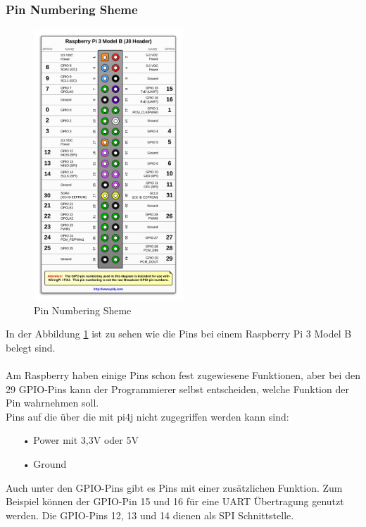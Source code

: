 \newpage

\subsubsection{Pin Numbering Sheme}

\begin{figure}
\vspace{-35pt}
  \begin{center}
    \includegraphics[width=0.50\textwidth]{Bilder/pi4j/PinNumberingSheme}
  \end{center}
  \caption[Pin Numbering Sheme]{Pin Numbering Sheme\protect\footnotemark}
  \label{Pin Numbering Sheme}
  \vspace{-120pt}
\end{figure}


In der Abbildung \ref{Pin Numbering Sheme} ist zu sehen wie die Pins bei einem Raspberry Pi 3 Model B belegt sind.
\\ \\
Am Raspberry haben einige Pins schon fest zugewiesene Funktionen, aber bei den 29 \ac{GPIO}-Pins kann der Programmierer selbst entscheiden, welche Funktion der Pin wahrnehmen soll.
\\Pins auf die über die mit \ac{pi4j} nicht zugegriffen werden kann sind:
\begin{itemize}
\item[•] Power mit 3,3V oder 5V
\item[•] Ground
\end{itemize}
\vspace{10pt}
Auch unter den \ac{GPIO}-Pins gibt es Pins mit einer zusätzlichen Funktion. Zum Beispiel können der \ac{GPIO}-Pin 15 und 16 für eine \ac{UART} Übertragung genutzt werden. Die \ac{GPIO}-Pins 12, 13 und 14 dienen als \ac{SPI} Schnittstelle.

